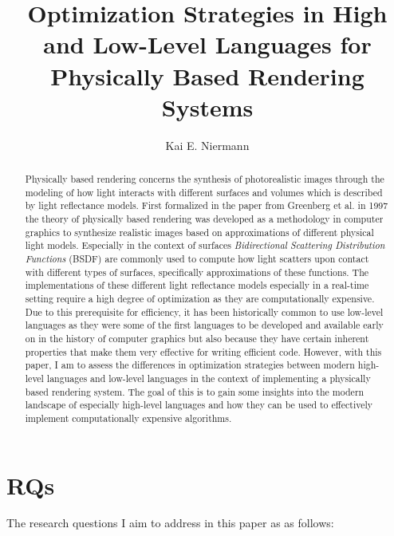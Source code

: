 \documentclass[11pt,a4paper,oneside]{article}
\begin{document}

\title{
    \textbf{Optimization Strategies in High and Low-Level Languages for Physically Based Rendering Systems}
}
\author{
Kai E. Niermann 
}
\date{}
\maketitle
% 

\begin{abstract}
    Physically based rendering concerns the synthesis of photorealistic images through the modeling of how light interacts with different surfaces and volumes which is described by light reflectance models. First formalized in the paper from Greenberg et al. in 1997 the theory of physically based rendering was developed as a methodology in computer graphics to synthesize realistic images based on approximations of different physical light models. Especially in the context of surfaces \textit{Bidirectional Scattering Distribution Functions} (BSDF) are commonly used to compute how light scatters upon contact with different types of surfaces, specifically approximations of these functions. The implementations of these different light reflectance models especially in a real-time setting require a high degree of optimization as they are computationally expensive. Due to this prerequisite for efficiency, it has been historically common to use low-level languages as they were some of the first languages to be developed and available early on in the history of computer graphics but also because they have certain inherent properties that make them very effective for writing efficient code. However, with this paper, I am to assess the differences in optimization strategies between modern high-level languages and low-level languages in the context of implementing a physically based rendering system. The goal of this is to gain some insights into the modern landscape of especially high-level languages and how they can be used to effectively implement computationally expensive algorithms. 
\end{abstract}

\section{RQs}

The research questions I aim to address in this paper as as follows:
\end{document}
